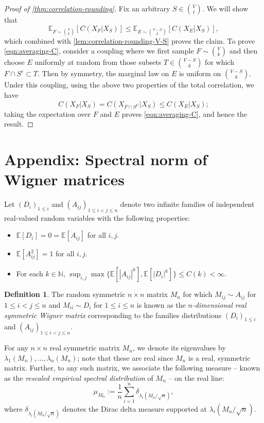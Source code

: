 \documentclass[11pt, oneside, english]{article}
\newcommand{\N}{\mathbb{N}}
\newcommand{\bE}{\mathbb{E}}
\newcommand{\E}{\bE}      %
\theoremstyle{definition}
\newtheorem{definition}[theorem]{Definition}
\theoremstyle{plain}
\begin{document}
\begin{proof}[Proof of \cref{thm:correlation-rounding}]
Fix an arbitrary $S \in {V \choose t}$. We will show that
\begin{equation}\label{eqn:averaging-C}
\E_{F \sim {V \choose k}}[C(X_F | X_S)] \le \E_{E \sim {V - S \choose k}}[C(X_E | X_S)],
\end{equation}
which combined with \cref{lem:correlation-rounding-V-S} proves the claim. To prove \cref{eqn:averaging-C}, consider a coupling where we first sample $F \sim {V \choose k}$ and then choose $E$ uniformly at random from those subsets  $T \in \binom{V-S}{k}$ for which $F \cap S^c \subset T$. Then by symmetry, the marginal law on $E$ is uniform on ${V - S \choose k}$. Under this coupling, using the above two properties of the total correlation, we have 
\[ C(X_F | X_S) = C(X_{F \cap S^C} | X_S) \le C(X_E | X_S); \]
taking the expectation over $F$ and $E$ proves \cref{eqn:averaging-C}, and hence the result.
\end{proof}

\section{Appendix: Spectral norm of Wigner matrices}
\label{appendix:semicircle}
Let $(D_{i})_{1\leq i}$ and $(A_{ij})_{1\leq i<j\leq n}$ denote
two infinite families of independent real-valued random variables
with the following properties: 
\begin{itemize}
\item $\E[D_i] = 0 = \E[A_{ij}]$ for all $i,j$.  
\item $\E[A_{ij}^{2}] = 1$ for all $i,j$. 
\item For each $k\in \N$, $\sup_{i,j}\max\{\E[|A_{ij}|^{k}],\E[|D_i|^{k}]\} \leq C(k)<\infty$.
\end{itemize}
\begin{definition}
The random symmetric $n\times n$ matrix  $M_n$ for which $M_{ij}\sim A_{ij}$ for $1\leq i< j\leq n$ and $M_{ii} \sim D_{i}$ for $1\leq i\leq n$ is known as the \emph{$n$-dimensional real symmetric Wigner matrix} corresponding to the families distributions $(D_i)_{1\leq i}$ and $(A_{ij})_{1\leq i < j \leq n}$. 
\end{definition}
For any $n\times n$ real symmetric matrix $M_n$, we denote its eigenvalues by $\lambda_1(M_n),\dots,\lambda_{n}(M_n)$; note that these are real since $M_n$ is a real, symmetric matrix. Further, to any such matrix, we associate the following measure -- known as the \emph{rescaled empirical spectral distribution} of $M_n$ -- on the real line:
$$\mu_{M_n} := \frac{1}{n}\sum_{i=1}^{n}\delta_{\lambda_i(M_n/\sqrt{n})},$$
where $\delta_{\lambda_i(M_n/\sqrt{n})}$ denotes the Dirac delta measure supported at $\lambda_i(M_n/\sqrt{n})$.
\end{document}
